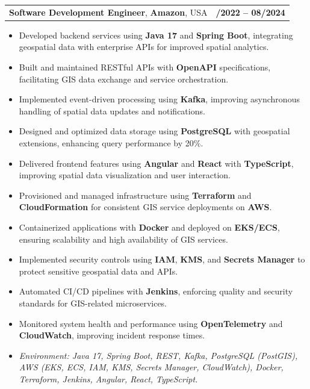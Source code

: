 \documentclass[letterpaper,11pt]{article}
\makeatletter
\newcommand{\resumeItem}[1]{
  \item\footnotesize{
    {#1 \vspace{-2pt}}
  }
}
\newcommand{\resumeSubheading}[4]{
  \vspace{-2pt}\item
    \begin{tabular*}{1.0\textwidth}[t]{l@{\extracolsep{\fill}}r}
      \textbf{\fontsize{10pt}{14pt}\selectfont #3}, \textbf{\fontsize{10pt}{14pt}\selectfont #1}, \fontsize{10pt}{14pt}\selectfont #4 & \textbf{\fontsize{10pt}{14pt}\selectfont #2} \\
    \end{tabular*}\vspace{-7pt}
}
\newcommand{\resumeItemListStart}{\begin{itemize}[leftmargin=*]}
\newcommand{\resumeItemListEnd}{\end{itemize}\vspace{-5pt}}
\makeatother
\begin{document}
\resumeSubheading
{Amazon}{10/2022 -- 08/2024}
{Software Development Engineer}{USA}
\resumeItemListStart
  \resumeItem{Developed backend services using \textbf{Java 17} and \textbf{Spring Boot}, integrating geospatial data with enterprise APIs for improved spatial analytics.}
  \resumeItem{Built and maintained RESTful APIs with \textbf{OpenAPI} specifications, facilitating GIS data exchange and service orchestration.}
  \resumeItem{Implemented event-driven processing using \textbf{Kafka}, improving asynchronous handling of spatial data updates and notifications.}
  \resumeItem{Designed and optimized data storage using \textbf{PostgreSQL} with geospatial extensions, enhancing query performance by 20\%.}
  \resumeItem{Delivered frontend features using \textbf{Angular} and \textbf{React} with \textbf{TypeScript}, improving spatial data visualization and user interaction.}
  \resumeItem{Provisioned and managed infrastructure using \textbf{Terraform} and \textbf{CloudFormation} for consistent GIS service deployments on \textbf{AWS}.}
  \resumeItem{Containerized applications with \textbf{Docker} and deployed on \textbf{EKS/ECS}, ensuring scalability and high availability of GIS services.}
  \resumeItem{Implemented security controls using \textbf{IAM}, \textbf{KMS}, and \textbf{Secrets Manager} to protect sensitive geospatial data and APIs.}
  \resumeItem{Automated CI/CD pipelines with \textbf{Jenkins}, enforcing quality and security standards for GIS-related microservices.}
  \resumeItem{Monitored system health and performance using \textbf{OpenTelemetry} and \textbf{CloudWatch}, improving incident response times.}
  \resumeItem{\textit{Environment: Java 17, Spring Boot, REST, Kafka, PostgreSQL (PostGIS), AWS (EKS, ECS, IAM, KMS, Secrets Manager, CloudWatch), Docker, Terraform, Jenkins, Angular, React, TypeScript.}}
\resumeItemListEnd
\end{document}
